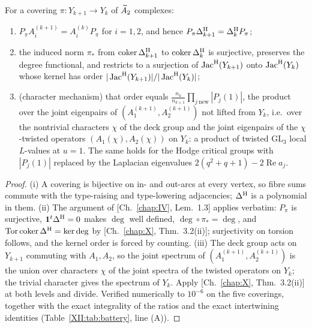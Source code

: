 \begin{theorem}\label{XII:thm:norm}
For a covering $\pi\colon Y_{k+1}\to Y_k$ of $\widetilde A_2$ complexes:
\begin{enumerate}
\item[(i)] $P_\pi A_i^{(k+1)}=A_i^{(k)}P_\pi$ for $i=1,2$, and hence
$P_\pi\Delta^{\mathrm{H}}_{k+1}=\Delta^{\mathrm{H}}_kP_\pi$;
\item[(ii)] the induced norm $\pi_*$ from $\operatorname{coker}\Delta^{\mathrm{H}}_{k+1}$ to $\operatorname{coker}\Delta^{\mathrm{H}}_k$ is
surjective, preserves the degree functional, and restricts to a surjection of
$\operatorname{Jac}^{\mathrm{H}}(Y_{k+1})$ onto $\operatorname{Jac}^{\mathrm{H}}(Y_k)$ whose kernel has order $|\operatorname{Jac}^{\mathrm{H}}(Y_{k+1})|/|\operatorname{Jac}^{\mathrm{H}}(Y_k)|$;
\item[(iii)] (character mechanism) that order equals
$\frac{n_k}{n_{k+1}}\prod_{j\ \mathrm{new}}|P_j(1)|$, the product over the joint eigenpairs of
$(A_1^{(k+1)},A_2^{(k+1)})$ not lifted from $Y_k$, i.e.\ over the nontrivial characters
$\chi$ of the deck group and the joint eigenpairs of the $\chi$-twisted operators
$(A_1(\chi),A_2(\chi))$ on $Y_k$: a product of twisted $\mathrm{GL}_3$ local $L$-values at
$u=1$. The same holds for the Hodge critical groups with $|P_j(1)|$ replaced by the
Laplacian eigenvalues $2(q^{2}+q+1)-2\operatorname{Re}a_j$.
\end{enumerate}
\end{theorem}

\begin{proof}
(i) A covering is bijective on in- and out-arcs at every vertex, so fibre sums commute with
the type-raising and type-lowering adjacencies; $\Delta^{\mathrm{H}}$ is a polynomial in them. (ii) The
argument of [Ch.~\ref{chap:IV}, Lem.~1.3] applies verbatim: $P_\pi$ is surjective, $\mathbf1^{t}\Delta^{\mathrm{H}}=0$
makes $\deg$ well defined, $\deg\circ\pi_*=\deg$, and $\operatorname{Tor}\operatorname{coker}\Delta^{\mathrm{H}}=\ker\deg$ by
[Ch.~\ref{chap:X}, Thm.~3.2(ii)]; surjectivity on torsion follows, and the kernel order is forced by
counting. (iii) The deck group acts on $Y_{k+1}$ commuting with $A_1,A_2$, so the joint
spectrum of $(A_1^{(k+1)},A_2^{(k+1)})$ is the union over characters $\chi$ of the joint
spectra of the twisted operators on $Y_k$; the trivial character gives the spectrum of
$Y_k$. Apply [Ch.~\ref{chap:X}, Thm.~3.2(ii)] at both levels and divide. Verified numerically to $10^{-6}$
on the five coverings, together with the exact integrality of the ratios and the exact
intertwining identities (Table~\ref{XII:tab:battery}, line (A)).
\end{proof}

